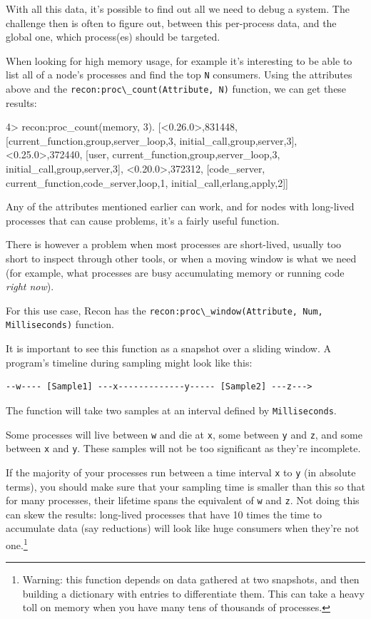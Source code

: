 \documentclass[11pt, oneside]{book}   	%
\newcommand{\function}[1]{\Verb`#1`}
\newcommand{\var}[1]{\Verb`#1`}
\begin{document}
With all this data, it's possible to find out all we need to debug a system. The challenge then is often to figure out, between this per-process data, and the global one, which process(es) should be targeted.

When looking for high memory usage, for example it's interesting to be able to list all of a node's processes and find the top \var{N} consumers. Using the attributes above and the \function{recon:proc\_count(Attribute, N)} function, we can get these results:

\begin{VerbatimEshell}
4> recon:proc_count(memory, 3).
[{<0.26.0>,831448,
  [{current_function,{group,server_loop,3}},
   {initial_call,{group,server,3}}]},
 {<0.25.0>,372440,
  [user,
   {current_function,{group,server_loop,3}},
   {initial_call,{group,server,3}}]},
 {<0.20.0>,372312,
  [code_server,
   {current_function,{code_server,loop,1}},
   {initial_call,{erlang,apply,2}}]}]
\end{VerbatimEshell}

Any of the attributes mentioned earlier can work, and for nodes with long-lived processes that can cause problems, it's a fairly useful function.

There is however a problem when most processes are short-lived, usually too short to inspect through other tools, or when a moving window is what we need (for example, what processes are busy accumulating memory or running code \emph{right now}).

For this use case, Recon has the \function{recon:proc\_window(Attribute, Num, Milliseconds)} function.

It is important to see this function as a snapshot over a sliding window. A program's timeline during sampling might look like this:

\begin{Verbatim}
--w---- [Sample1] ---x-------------y----- [Sample2] ---z--->
\end{Verbatim}

The function will take two samples at an interval defined by \var{Milliseconds}.

Some processes will live between \var{w} and die at \var{x}, some between \var{y} and \var{z}, and some between \var{x} and \var{y}. These samples will not be too significant as they're incomplete.

If the majority of your processes run between a time interval \var{x} to \var{y} (in absolute terms), you should make sure that your sampling time is smaller than this so that for many processes, their lifetime spans the equivalent of \var{w} and \var{z}. Not doing this can skew the results: long-lived processes that have 10 times the time to accumulate data (say reductions) will look like huge consumers when they're not one.\footnote{Warning: this function depends on data gathered at two snapshots, and then building a dictionary with entries to differentiate them. This can take a heavy toll on memory when you have many tens of thousands of processes.}
\end{document}
